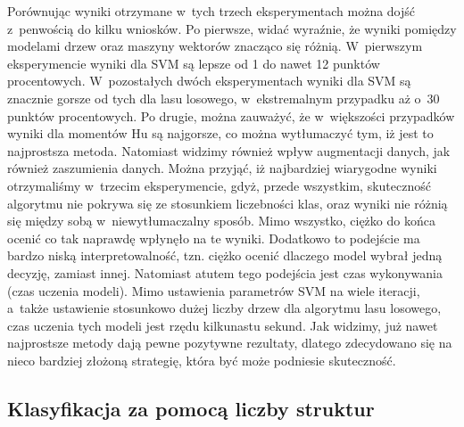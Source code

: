 Porównując wyniki otrzymane w~tych trzech eksperymentach można dojść z~penwością do kilku wniosków. Po pierwsze, widać wyraźnie, że wyniki pomiędzy modelami drzew oraz maszyny wektorów znacząco się różnią. W~pierwszym eksperymencie wyniki dla SVM są lepsze od 1 do nawet 12 punktów procentowych. W~pozostałych dwóch eksperymentach wyniki dla SVM są znacznie gorsze od tych dla lasu losowego, w~ekstremalnym przypadku aż o~30 punktów procentowych. Po drugie, można zauważyć, że w~większości przypadków wyniki dla momentów Hu są najgorsze, co można wytłumaczyć tym, iż jest to najprostsza metoda. Natomiast widzimy również wpływ augmentacji danych, jak również zaszumienia danych. Można przyjąć, iż najbardziej wiarygodne wyniki otrzymaliśmy w~trzecim eksperymencie, gdyż, przede wszystkim, skuteczność algorytmu nie pokrywa się ze stosunkiem liczebności klas, oraz wyniki nie różnią się między sobą w~niewytłumaczalny sposób. Mimo wszystko, ciężko do końca ocenić co tak naprawdę wpłynęło na te wyniki. Dodatkowo to podejście ma bardzo niską interpretowalność, tzn. ciężko ocenić dlaczego model wybrał jedną decyzję, zamiast innej. Natomiast atutem tego podejścia jest czas wykonywania (czas uczenia modeli). Mimo ustawienia parametrów SVM na wiele iteracji, a~także ustawienie stosunkowo dużej liczby drzew dla algorytmu lasu losowego, czas uczenia tych modeli jest rzędu kilkunastu sekund. Jak widzimy, już nawet najprostsze metody dają pewne pozytywne rezultaty, dlatego zdecydowano się na nieco bardziej złożoną strategię, która być może podniesie skuteczność.

\subsection{Klasyfikacja za pomocą liczby struktur}
\label{Klasyfikacja za pomocą liczby struktur} %


